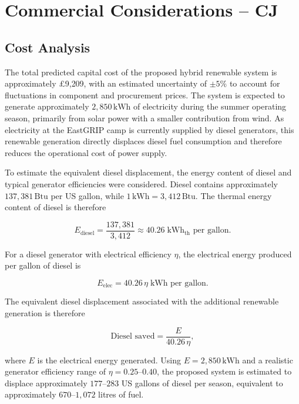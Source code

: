 \documentclass[11pt,a4paper]{article}
\begin{document}
\section{Commercial Considerations -- CJ}

\subsection{Cost Analysis}

The total predicted capital cost of the proposed hybrid renewable system is
approximately £9{,}209, with an estimated uncertainty of $\pm 5\%$ to account
for fluctuations in component and procurement prices. The system is expected
to generate approximately $2{,}850\,\text{kWh}$ of electricity during the
summer operating season, primarily from solar power with a smaller
contribution from wind. As electricity at the EastGRIP camp is currently
supplied by diesel generators, this renewable generation directly displaces
diesel fuel consumption and therefore reduces the operational cost of power
supply.

To estimate the equivalent diesel displacement, the energy content of diesel
and typical generator efficiencies were considered. Diesel contains
approximately $137{,}381\,\text{Btu}$ per US gallon, while
$1\,\text{kWh} = 3{,}412\,\text{Btu}$. The thermal energy content of diesel is
therefore

\begin{equation}
E_{\text{diesel}}=
\frac{137{,}381}{3{,}412}
\approx 40.26 \;\text{kWh}_{\text{th}} \text{ per gallon}.
\end{equation}

For a diesel generator with electrical efficiency $\eta$, the electrical
energy produced per gallon of diesel is

\begin{equation}
E_{\text{elec}} = 40.26\,\eta \;\text{kWh per gallon}.
\end{equation}

The equivalent diesel displacement associated with the additional renewable
generation is therefore

\begin{equation}
\text{Diesel saved} = \frac{E}{40.26\,\eta},
\end{equation}

where $E$ is the electrical energy generated. Using
$E = 2{,}850\,\text{kWh}$ and a realistic generator efficiency range of
$\eta = 0.25$--$0.40$, the proposed system is estimated to displace
approximately $177$--$283$ US gallons of diesel per season, equivalent to
approximately $670$--$1{,}072$ litres of fuel.
\end{document}
